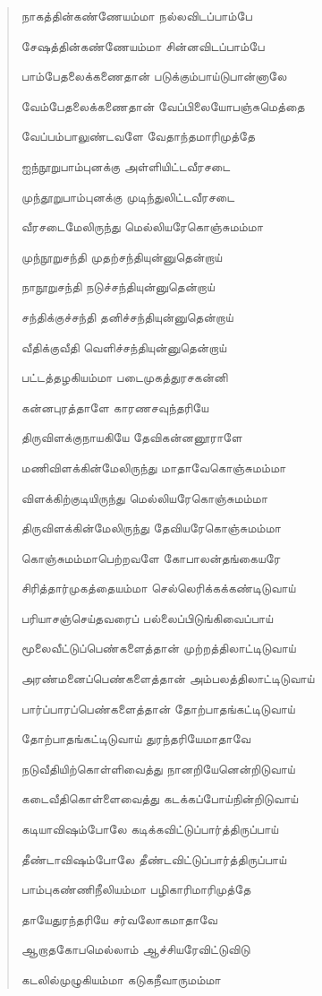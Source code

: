 \documentclass{article}
\begin{document}
\begin{quotation}
{நாகத்தின்கண்ணேயம்மா நல்லவிடப்பாம்பே

சேஷத்தின்கண்ணேயம்மா சின்னவிடப்பாம்பே

பாம்பேதலைக்கணைதான் படுக்கும்பாய்டுபான்னாலே

வேம்பேதலைக்கணைதான் வேப்பிலையோபஞ்சுமெத்தை

வேப்பம்பாலுண்டவளே வேதாந்தமாரிமுத்தே

ஐந்நூறுபாம்புனக்கு அள்ளியிட்டவீரசடை

முந்தூறுபாம்புனக்கு முடிந்துலிட்டவீரசடை

வீரசடைமேலிருந்து மெல்லியரேகொஞ்சுமம்மா

முந்நூறுசந்தி முதற்சந்தியுன்னுதென்றாய்

நாநூறுசந்தி நடுச்சந்தியுன்னுதென்றாய்

சந்திக்குச்சந்தி தனிச்சந்தியுன்னுதென்றாய்

வீதிக்குவீதி வெளிச்சந்தியுன்னுதென்றாய்

பட்டத்தழகியம்மா படைமுகத்துரசகன்னி

கன்னபுரத்தாளே காரணசவுந்தரியே

திருவிளக்குநாயகியே தேவிகன்னனூராளே

மணிவிளக்கின்மேலிருந்து மாதாவேகொஞ்சுமம்மா

விளக்கிற்குடியிருந்து மெல்லியரேகொஞ்சுமம்மா

திருவிளக்கின்மேலிருந்து தேவியரேகொஞ்சுமம்மா

கொஞ்சுமம்மாபெற்றவளே கோபாலன்தங்கையரே

சிரித்தார்முகத்தையம்மா செல்லெரிக்கக்கண்டிடுவாய்

பரியாசஞ்செய்தவரைப் பல்லைப்பிடுங்கிவைப்பாய்

மூலைவீட்டுப்பெண்களைத்தான் முற்றத்திலாட்டிடுவாய்

அரண்மனைப்பெண்களைத்தான் அம்பலத்திலாட்டிடுவாய்

பார்ப்பாரப்பெண்களைத்தான் தோற்பாதங்கட்டிடுவாய்

தோற்பாதங்கட்டிடுவாய் துரந்தரியேமாதாவே

நடுவீதியிற்கொள்ளிவைத்து நானறியேனென்றிடுவாய்

கடைவீதிகொள்ளைவைத்து கடக்கப்போய்நின்றிடுவாய்

கடியாவிஷம்போலே கடிக்கவிட்டுப்பார்த்திருப்பாய்

தீண்டாவிஷம்போலே தீண்டவிட்டுப்பார்த்திருப்பாய்

பாம்புகண்ணிநீலியம்மா பழிகாரிமாரிமுத்தே

தாயேதுரந்தரியே சர்வலோகமாதாவே

ஆறாதகோபமெல்லாம் ஆச்சியரேவிட்டுவிடு

கடலில்முழுகியம்மா கடுகநீவாருமம்மா

}
\end{quotation}
\end{document}
